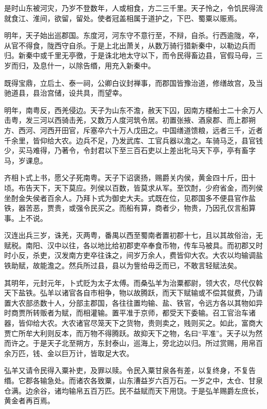 \documentclass[12pt,UTF8]{ctexbook}
\begin{document}
是时山东被河灾，乃岁不登数年，人或相食，方二三千里。天子怜之，令饥民得流就食江、淮间，欲留，留处。使者冠盖相属于道护之，下巴、蜀粟以赈焉。



明年，天子始出巡郡国。东度河，河东守不意行至，不辩，自杀。行西逾陇，卒，从官不得食，陇西守自杀。于是上北出萧关，从数万骑行猎新秦中，以勒边兵而归。新秦中或千里无亭徼，于是诛北地太守以下，而令民得畜边县，官假马母，三岁而归，及息什一，以除告缗，用充入新秦中。



既得宝鼎，立后土、泰一祠，公卿白议封禅事，而郡国皆豫治道，修缮故宫，及当驰道县，县治宫储，设共具，而望幸。



明年，南粤反，西羌侵边。天子为山东不澹，赦天下囚，因南方楼船士二十余万人击粤，发三河以西骑击羌，又数万人度河筑令居。初置张掖、酒泉郡、而上郡朔方、西河、河西开田官，斥塞卒六十万人戊田之。中国缮道馈粮，远者三千，近者千余里，皆仰给大农。边兵不足，乃发武库、工官兵器以澹之。车骑马乏，县官钱少，买马难得，乃著令，令封君以下至三百石吏以上差出牝马天下亭，亭有畜字马，岁课息。



齐相卜式上书，愿父子死南粤。天子下诏褒扬，赐爵关内侯，黄金四十斤，田十顷。布告天下，天下莫应。列侯以百数，皆莫求从军。至饮酎，少府省金，而列侯坐酎金失侯者百余人。乃拜卜式为御史大夫。式既在位，见郡国多不便县官作盐铁，器苦恶，贾贵，或强令民买之。而船有算，商者少，物贵，乃因孔仅言船算事。上不说。



汉连出兵三岁，诛羌，灭两粤，番禺以西至蜀南者置初郡十七，且以其故俗治，无赋税。南阳、汉中以往，各以地比给初郡吏卒奉食币物，传车马被具。而初郡又时时小反，杀吏，汉发南方吏卒往诛之，间岁万余人，费皆仰大农。大农以均输调盐铁助赋，故能澹之。然兵所过县，县以为訾给毋乏而已，不敢言轻赋法矣。



其明年，元封元年，卜式贬为太子太傅。而桑弘羊为治粟都尉，领大农，尽代仅斡天下盐铁。弘羊以诸官各自市相争，物以故腾跃，而天下赋输或不偿其僦费，乃请置大农部丞数十人，分部主郡国，各往往置均输、盐、铁官，令远方各以其物如异时商贾所转贩者为赋，而相灌输。置平准于京师，都受天下委输。召工官治车诸器，皆仰给大农。大农诸官尽笼天下之货物，贵则卖之，贱则买之。如此，富商大贾亡所牟大利则反本，而万物不得腾跃。故抑天下之物，名曰“平准”。天子以为然而许之。于是天子北至朔方，东封泰山，巡海上，旁北边以归。所过赏赐，用帛百余万匹，钱、金以巨万计，皆取足大农。



弘羊又请令民得入粟补吏，及罪以赎。令民入粟甘泉各有差，以复终身，不复告缗。它郡各输急处。而诸农各致粟，山东漕益岁六百万石。一岁之中，太仓、甘泉仓满。边余谷，诸均输帛五百万匹。民不益赋而天下用饶。于是弘羊赐爵左庶长，黄金者再百焉。
\end{document}
